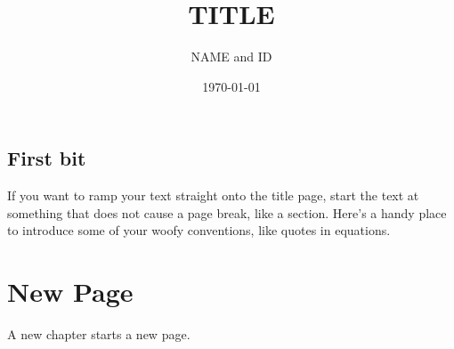 \documentclass[notitlepage]{report}
\title{TITLE}
\author{NAME and ID}
\date{\today}
\begin{document}
	
	\maketitle
	\thispagestyle{empty}
	
	\begin{abstract}
		\lipsum[1]
	\end{abstract}
	
	\section*{First bit}
		If you want to ramp your text straight onto the title page, start the text at 
		something that does not cause a page break, like a section.  Here's a handy 
		place to introduce some of your woofy conventions, like quotes in equations.
	\chapter{New Page}
		A new chapter starts a new page.
		
\end{document}
